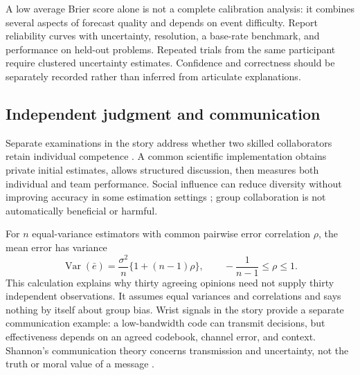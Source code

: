 A low average Brier score alone is not a complete calibration analysis: it combines several aspects of forecast quality and depends on event difficulty. Report reliability curves with uncertainty, resolution, a base-rate benchmark, and performance on held-out problems. Repeated trials from the same participant require clustered uncertainty estimates. Confidence and correctness should be separately recorded rather than inferred from articulate explanations.

\subsection{Independent judgment and communication}
Separate examinations in the story address whether two skilled collaborators retain individual competence . A common scientific implementation obtains private initial estimates, allows structured discussion, then measures both individual and team performance. Social influence can reduce diversity without improving accuracy in some estimation settings \cite{lorenz}; group collaboration is not automatically beneficial or harmful.

For $n$ equal-variance estimators with common pairwise error correlation $\rho$, the mean error has variance
\begin{equation}
 \operatorname{Var}(\bar e)=\frac{\sigma^2}{n}\{1+(n-1)\rho\},
 \qquad -\frac{1}{n-1}\leq\rho\leq1.
\end{equation}
This calculation explains why thirty agreeing opinions need not supply thirty independent observations. It assumes equal variances and correlations and says nothing by itself about group bias. Wrist signals in the story provide a separate communication example: a low-bandwidth code can transmit decisions, but effectiveness depends on an agreed codebook, channel error, and context. Shannon's communication theory concerns transmission and uncertainty, not the truth or moral value of a message \cite{shannon}.
